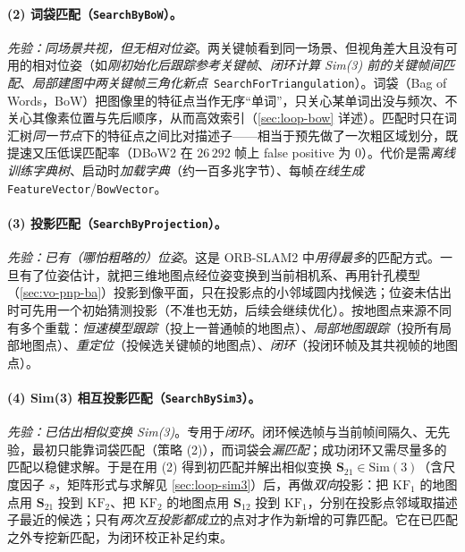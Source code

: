 \paragraph{(2) 词袋匹配（\texttt{SearchByBoW}）。}
\emph{先验：同场景共视，但无相对位姿}\cite{galvez2012bags}。两关键帧看到同一场景、但视角差大且没有可用的相对位姿（如\emph{刚初始化后跟踪参考关键帧}、\emph{闭环计算 Sim(3) 前的关键帧间匹配}、\emph{局部建图中两关键帧三角化新点}~\texttt{SearchForTriangulation}）。词袋（Bag of Words，BoW）把图像里的特征点当作无序“单词”，只关心某单词出没与频次、不关心其像素位置与先后顺序，从而高效索引（\cref{sec:loop-bow} 详述）。匹配时只在词汇树\emph{同一节点}下的特征点之间比对描述子——相当于预先做了一次粗区域划分，既提速又压低误匹配率（DBoW2 在 $26\,292$ 帧上 false positive 为 $0$）。代价是需\emph{离线训练字典树}、启动时\emph{加载字典}（约一百多兆字节）、每帧\emph{在线生成} \texttt{FeatureVector}/\allowbreak\texttt{BowVector}。

\paragraph{(3) 投影匹配（\texttt{SearchByProjection}）。}
\emph{先验：已有（哪怕粗略的）位姿}\cite{murartal2017orbslam2}。这是 ORB-SLAM2 中\emph{用得最多}的匹配方式。一旦有了位姿估计，就把三维地图点经位姿变换到当前相机系、再用针孔模型（\cref{sec:vo-pnp-ba}）投影到像平面，只在投影点的小邻域圆内找候选；位姿未估出时可先用一个初始猜测投影（不准也无妨，后续会继续优化）。按地图点来源不同有多个重载：\emph{恒速模型跟踪}（投上一普通帧的地图点）、\emph{局部地图跟踪}（投所有局部地图点）、\emph{重定位}（投候选关键帧的地图点）、\emph{闭环}（投闭环帧及其共视帧的地图点）。

\paragraph{(4) Sim(3) 相互投影匹配（\texttt{SearchBySim3}）。}
\emph{先验：已估出相似变换 Sim(3)}\cite{murartal2017orbslam2}。专用于\emph{闭环}。闭环候选帧与当前帧间隔久、无先验，最初只能靠词袋匹配（策略 (2)），而词袋会\emph{漏匹配}；成功闭环又需尽量多的匹配以稳健求解。于是在用 (2) 得到初匹配并解出相似变换 $\mathbf{S}_{21}\in\mathrm{Sim}(3)$（含尺度因子 $s$，矩阵形式与求解见 \cref{sec:loop-sim3}）后，再做\emph{双向}投影：把 $\mathrm{KF}_1$ 的地图点用 $\mathbf{S}_{21}$ 投到 $\mathrm{KF}_2$、把 $\mathrm{KF}_2$ 的地图点用 $\mathbf{S}_{12}$ 投到 $\mathrm{KF}_1$，分别在投影点邻域取描述子最近的候选；只有\emph{两次互投影都成立}的点对才作为新增的可靠匹配。它在已匹配之外专挖新匹配，为闭环校正补足约束。

